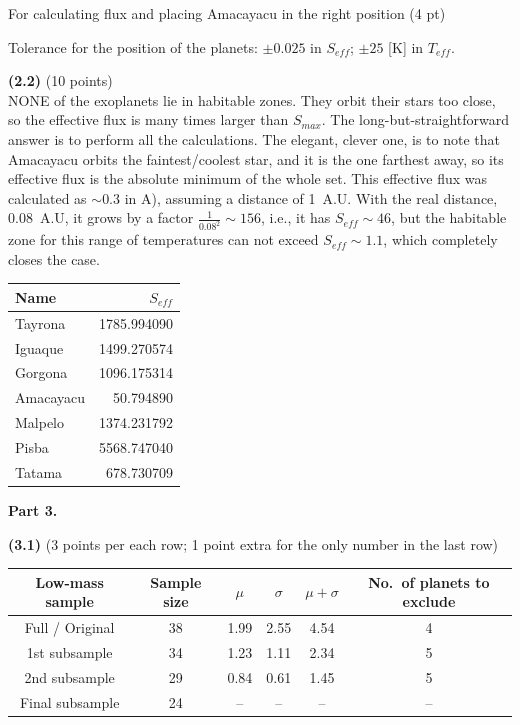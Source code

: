 For calculating flux and placing Amacayacu in the right position \hfill(4 pt)

Tolerance for the position of the planets: $\pm0.025$ in $S_{eff}$; $\pm25$
[K] in $T_{eff}$.

\medskip
\noindent\textbf{(2.2)} \hfill(10 points)\\
NONE of the exoplanets lie in habitable zones. They orbit their stars too
close, so the effective flux is many times larger than $S_{max}$. The
long-but-straightforward answer is to perform all the calculations. The
elegant, clever one, is to note that Amacayacu orbits the faintest/coolest
star, and it is the one farthest away, so its effective flux is the absolute
minimum of the whole set. This effective flux was calculated as ${\sim}0.3$
in A), assuming a distance of 1~A.U. With the real distance, 0.08~A.U, it
grows by a factor $\frac{1}{0.08^2}\sim156$, i.e., it has
$S_{eff}\sim46$, but the habitable zone for this range of temperatures can
not exceed $S_{eff}\sim1.1$, which completely closes the case.

\begin{center}
\begin{tabular}{lr}
\toprule
Name & $S_{eff}$\\
\midrule
Tayrona & 1785.994090\\
Iguaque & 1499.270574\\
Gorgona & 1096.175314\\
Amacayacu & 50.794890\\
Malpelo & 1374.231792\\
Pisba & 5568.747040\\
Tatama & 678.730709\\
\bottomrule
\end{tabular}
\end{center}

\medskip
\noindent\textbf{Part 3.}

\noindent\textbf{(3.1)} (3 points per each row; 1 point extra for the only
number in the last row)

\begin{center}
\begin{tabular}{cccccc}
\toprule
Low-mass sample & Sample size & $\mu$ & $\sigma$ & $\mu+\sigma$
  & No.\ of planets to exclude\\
\midrule
Full / Original & 38 & 1.99 & 2.55 & 4.54 & 4\\
1st subsample & 34 & 1.23 & 1.11 & 2.34 & 5\\
2nd subsample & 29 & 0.84 & 0.61 & 1.45 & 5\\
Final subsample & 24 & -- & -- & -- & --\\
\bottomrule
\end{tabular}
\end{center}

